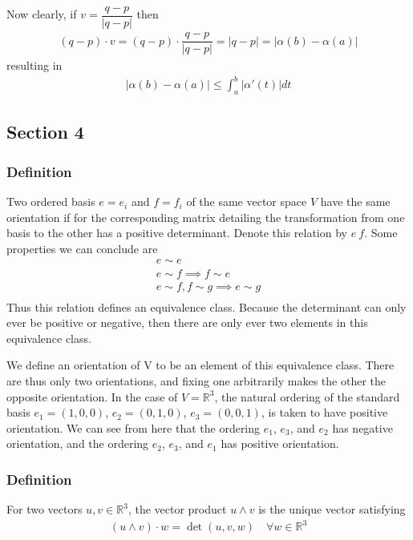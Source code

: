 \documentclass{article}
\newcommand{\R}{\mathbb{R}}
\begin{document}
	Now clearly, if $v = \dfrac{q - p}{|q - p|}$ then
	\begin{gather*}
		(q - p) \cdot v = (q - p) \cdot \dfrac{q - p}{|q - p|} = |q - p| = |\alpha(b) - \alpha(a)|
	\end{gather*}
	resulting in
	\begin{gather*}
		|\alpha(b) - \alpha(a)| \leq \int_a^b |\alpha'(t)| dt
	\end{gather*}
	
	
	\subsection*{Section 4}
	\subsubsection*{Definition}
	Two ordered basis $e = {e_i}$ and $f = {f_i}$ of the same vector space $V$ have the same orientation if for the corresponding matrix detailing the transformation from one basis to the other has a positive determinant. Denote this relation by $e ~ f$. Some properties we can conclude are
	\begin{gather*}
		e \sim e \\
		e \sim f \implies f \sim e \\
		e \sim f, f \sim g \implies e \sim g \\
	\end{gather*}
	Thus this relation defines an equivalence class. Because the determinant can only ever be positive or negative, then there are only ever two elements in this equivalence class.
	
	We define an orientation of V to be an element of this equivalence class. There are thus only two orientations, and fixing one arbitrarily makes the other the opposite orientation. In the case of $V = \R^3$, the natural ordering of the standard basis $e_1 = (1, 0, 0)$, $e_2 = (0, 1, 0)$, $e_3 = (0, 0, 1)$, is taken to have positive orientation. We can see from here that the ordering $e_1$, $e_3$, and $e_2$ has negative orientation, and the ordering $e_2$, $e_3$, and $e_1$ has positive orientation.
	
	\subsubsection*{Definition}
	For two vectors $u, v \in \R^3$, the vector product $u \wedge v$ is the unique vector satisfying
	\begin{gather*}
		(u \wedge v) \cdot w = \det(u, v, w) \quad \forall w \in \R^3
	\end{gather*}
	
\end{document}

